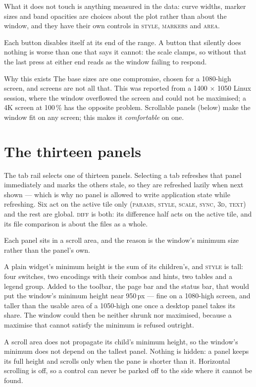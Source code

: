 \documentclass[11pt,a4paper,oneside]{report}
\newcommand{\tab}[1]{\textsc{#1}}
\begin{document}
What it does not touch is anything measured in the data: curve widths, marker
sizes and band opacities are choices about the plot rather than about the
window, and they have their own controls in \tab{style}, \tab{markers} and
\tab{area}.

Each button disables itself at its end of the range. A button that silently
does nothing is worse than one that says it cannot: the scale clamps, so
without that the last press at either end reads as the window failing to
respond.

\begin{aoenote}{Why this exists}
The base sizes are one compromise, chosen for a 1080-high screen, and screens
are not all that. This was reported from a 1400 $\times$ 1050 Linux session,
where the window overflowed the screen and could not be maximised; a 4K screen
at 100\,\% has the opposite problem. Scrollable panels (below) make the window
fit on any screen; this makes it \emph{comfortable} on one.
\end{aoenote}

\chapter{The thirteen panels}

The tab rail selects one of thirteen panels. Selecting a tab refreshes that panel
immediately and marks the others stale, so they are refreshed lazily when next
shown --- which is why no panel is allowed to write application state while
refreshing. Six act on the active tile only (\tab{params}, \tab{style},
\tab{scale}, \tab{sync}, \tab{3d}, \tab{text}) and the rest are global.
\tab{diff} is both: its difference half acts on the active tile, and its file
comparison is about the files as a whole.

Each panel sits in a scroll area, and the reason is the window's minimum size
rather than the panel's own.

A plain widget's minimum height is the sum of its children's, and \tab{style} is
tall: four switches, two encodings with their combos and hints, two tables and a
legend group. Added to the toolbar, the page bar and the status bar, that would
put the window's minimum height near 950\,px --- fine on a 1080-high screen, and
taller than the usable area of a 1050-high one once a desktop panel takes its
share. The window could then be neither shrunk nor maximised, because a maximise
that cannot satisfy the minimum is refused outright.

A scroll area does not propagate its child's minimum height, so the window's
minimum does not depend on the tallest panel. Nothing is hidden: a panel keeps
its full height and scrolls only when the pane is shorter than it. Horizontal
scrolling is off, so a control can never be parked off to the side where it
cannot be found.
\end{document}
